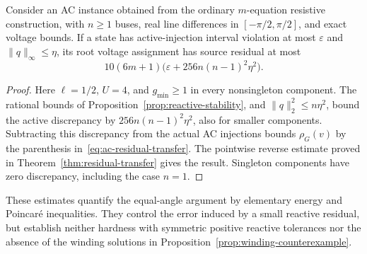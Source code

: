 \begin{corollary}
\label{cor:ac-residual-transfer}
Consider an AC instance obtained from the ordinary $m$-equation resistive
construction, with $n\ge1$ buses, real line differences in
$[-\pi/2,\pi/2]$, and exact voltage bounds. If a state has active-injection
interval violation at most $\varepsilon$ and $\|q\|_\infty\le\eta$, its
root voltage assignment has source residual at most
\begin{equation}
 10(6m+1)\bigl(\varepsilon+256n(n-1)^2\eta^2\bigr).
 \label{eq:ac-residual-transfer}
\end{equation}
\end{corollary}
\begin{proof}
Here $\ell=1/2$, $U=4$, and $g_{\min}\ge1$ in every nonsingleton
component. The rational bounds of Proposition~\ref{prop:reactive-stability},
and $\|q\|_2^2\le n\eta^2$, bound the active discrepancy by
$256n(n-1)^2\eta^2$, also for smaller components. Subtracting this
discrepancy from the actual AC injections bounds $\rho_G(v)$ by the
parenthesis in~\eqref{eq:ac-residual-transfer}. The pointwise reverse
estimate proved in Theorem~\ref{thm:residual-transfer} gives the result.
Singleton components have zero discrepancy, including the case $n=1$.
\end{proof}

These estimates quantify the equal-angle argument by elementary energy and
Poincar\'e inequalities. They control the error induced by a small reactive
residual, but establish neither hardness with symmetric positive reactive
tolerances nor the absence of the winding solutions in
Proposition~\ref{prop:winding-counterexample}.

